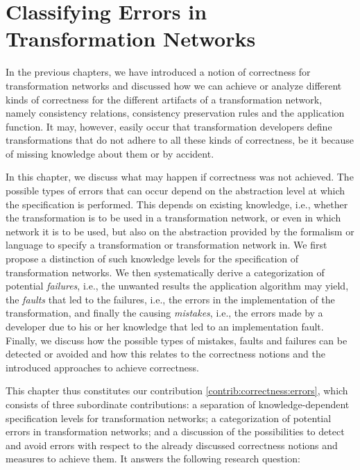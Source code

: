 \chapter{Classifying Errors in Transformation Networks 
}
\label{chap:errors}

In the previous chapters, we have introduced a notion of correctness for transformation networks and discussed how we can achieve or analyze different kinds of correctness for the different artifacts of a transformation network, namely consistency relations, consistency preservation rules and the application function.
It may, however, easily occur that transformation developers define transformations that do not adhere to all these kinds of correctness, be it because of missing knowledge about them or by accident.

In this chapter, we discuss what may happen if correctness was not achieved.
The possible types of errors that can occur depend on the abstraction level at which the specification is performed. 
This depends on existing knowledge, i.e., whether the transformation is to be used in a transformation network, or even in which network it is to be used, but also on the abstraction provided by the formalism or language to specify a transformation or transformation network in.
We first propose a distinction of such knowledge levels for the specification of transformation networks.
We then systematically derive a categorization of potential \emph{failures}, i.e., the unwanted results the application algorithm may yield, the \emph{faults} that led to the failures, i.e., the errors in the implementation of the transformation, and finally the causing \emph{mistakes}, i.e., the errors made by a developer due to his or her knowledge that led to an implementation fault.
Finally, we discuss how the possible types of mistakes, faults and failures can be detected or avoided and how this relates to the correctness notions and the introduced approaches to achieve correctness.

This chapter thus constitutes our contribution \autoref{contrib:correctness:errors}, which consists of three subordinate contributions: a separation of knowledge-dependent specification levels for transformation networks; a categorization of potential errors in transformation networks; and a discussion of the possibilities to detect and avoid errors with respect to the already discussed correctness notions and measures to achieve them.
It answers the following research question:


